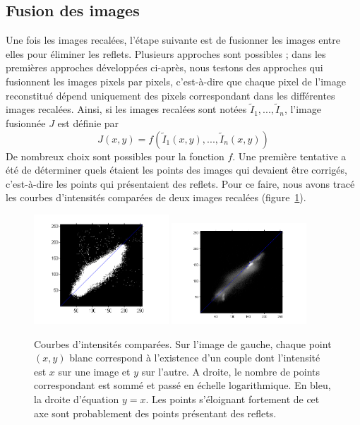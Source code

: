 \documentclass[12pt,a4paper]{article}
\begin{document}
\subsection{Fusion des images}
Une fois les images recalées, l'étape suivante est de fusionner les images entre elles pour éliminer les reflets. Plusieurs approches sont possibles ; dans les premières approches développées ci-après, nous testons des approches qui fusionnent les images pixels par pixels, c'est-à-dire que chaque pixel de l'image reconstitué dépend uniquement des pixels correspondant dans les différentes images recalées. Ainsi, si les images recalées sont notées \( \tilde I_1, ..., \tilde I_n \), l'image fusionnée \(J\) est définie par
\[
J(x,y)=f\left(\tilde I_1(x,y), ..., \tilde I_n(x,y)\right)
\]
De nombreux choix sont possibles pour la fonction $f$. Une première tentative a été de déterminer quels étaient les points des images qui devaient être corrigés, c'est-à-dire les points qui présentaient des reflets. Pour ce faire, nous avons tracé les courbes d'intensités comparées de deux images recalées (figure~\ref{itensitecompare}). 
\begin{figure}
\centering
\includegraphics[width=0.45\textwidth]{Fig/compareintensities.png}
\includegraphics[width=0.45\textwidth]{Fig/compareintensities_log.png}
\caption{Courbes d'intensités comparées. Sur l'image de gauche, chaque point $(x,y)$ blanc correspond à l'existence d'un couple dont l'intensité est $x$ sur une image et $y$ sur l'autre. A droite, le nombre de points correspondant est sommé et passé en échelle logarithmique. En bleu, la droite d'équation $y=x$. Les points s'éloignant fortement de cet axe sont probablement des points présentant des reflets.}
\label{itensitecompare}
\end{figure}
\end{document}
